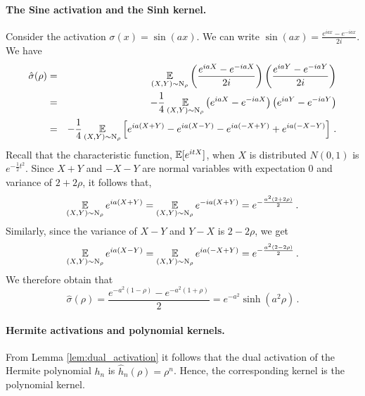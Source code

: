 \paragraph*{The Sine activation and the Sinh kernel.} Consider the activation
$\sigma(x)=\sin(ax)$. We can write
$\sin(ax) = \frac{e^{iax} - e^{-iax}}{2i}$. We have
\begin{eqnarray*}
\hat \sigma (\rho) &=&
  \operatorname*{\mathbb{E}}_{(X,Y)\sim\text{N}_{\rho}}
    \left(\frac{e^{iaX} - e^{-iaX}}{2i}\right)
    \left(\frac{e^{iaY} - e^{-iaY}}{2i}\right)
\\
&=& -\frac{1}{4}\operatorname*{\mathbb{E}}_{(X,Y)\sim\text{N}_{\rho}}
  \left(e^{iaX} - e^{-iaX}\right)
  \left(e^{iaY} - e^{-iaY}\right)
\\
&=& -\frac{1}{4}\operatorname*{\mathbb{E}}_{(X,Y)\sim\text{N}_{\rho}}
  \left[ e^{ia(X+Y)}- e^{ia(X-Y)}-e^{ia(-X+Y)}+e^{ia(-X-Y)} \right]\,.
\end{eqnarray*}
Recall that the
characteristic function, $\operatorname*{\mathbb{E}}[e^{itX}]$, when $X$ is distributed $N(0,1)$
is $e^{-\frac{1}{2} t^2}$.
Since $X+Y$ and $-X-Y$ are normal variables with expectation $0$ and
variance of $2+2\rho$, it follows that,
$$\operatorname*{\mathbb{E}}_{(X,Y)\sim\text{N}_{\rho}}e^{ia(X+Y)} =
  \operatorname*{\mathbb{E}}_{(X,Y)\sim\text{N}_{\rho}}e^{-ia(X+Y)} =
  e^{-\frac{a^2(2+2\rho)}{2}} \,.$$
Similarly, since the variance of $X-Y$ and $Y-X$ is $2-2\rho$, we get
$$\operatorname*{\mathbb{E}}_{(X,Y)\sim\text{N}_{\rho}}e^{ia(X-Y)} =
  \operatorname*{\mathbb{E}}_{(X,Y)\sim\text{N}_{\rho}}e^{ia(-X+Y)} =
  e^{-\frac{a^2(2-2\rho)}{2}} \,.$$
We therefore obtain that
\[
\hat\sigma(\rho) =
  \frac{e^{-a^2(1-\rho)} - e^{-a^2(1+\rho)}}{2} = e^{-a^2}\sinh (a^2\rho)\,.
\]

\paragraph*{Hermite activations and polynomial kernels.} From Lemma
\ref{lem:dual_activation} it follows that the dual activation of the Hermite
polynomial $h_n$ is $\hat h_n(\rho)=\rho^n$. Hence, the corresponding kernel
is the polynomial kernel.

